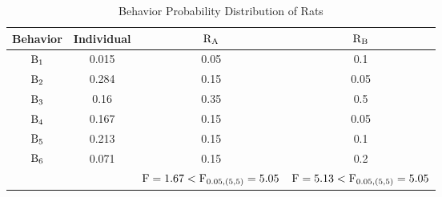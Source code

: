 \begin{table}[b]
    \caption{Behavior Probability Distribution of Rats}    
    \centering
    \begin{tabular}{cccc}
            \hline
            Behavior & Individual & $\rm R_A$ & $\rm R_B$ \\
            \hline
            $\rm B_1$ & 0.015 & 0.05 & 0.1 \\
            $\rm B_2$ & 0.284 & 0.15 & 0.05 \\
            $\rm B_3$ & 0.16 & 0.35 & 0.5 \\
            $\rm B_4$ & 0.167 & 0.15 & 0.05 \\
            $\rm B_5$ & 0.213 & 0.15 & 0.1 \\
            $\rm B_6$ & 0.071 & 0.15 & 0.2 \\
             &  & ${\rm F}=1.67<{\rm F}_{0.05,(5,5)}=5.05$ & ${\rm F}=5.13<{\rm F}_{0.05,(5,5)}=5.05$ \\
            \hline
            \end{tabular}
    \label{table:Behavior Probability Distribution of Rats}
\end{table}
